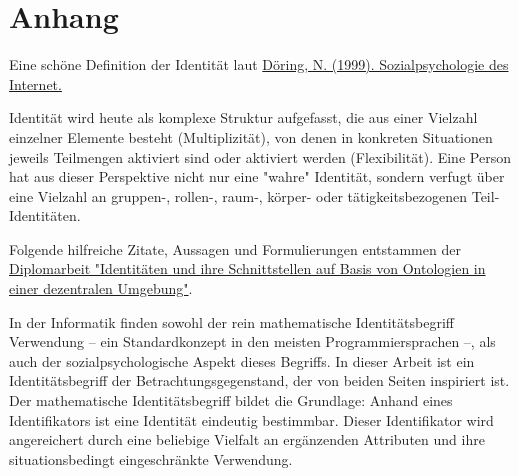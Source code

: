 \section{Anhang}
\label{sec:anhang}

\vspace{0.3cm}

Eine schöne Definition der Identität laut \href{https://link.springer.com/article/10.1007/s11612-001-0022-y}{Döring, N. (1999). Sozialpsychologie des Internet.}

\vspace{0.3cm}

\begin{Business-Def}

Identität wird heute als komplexe Struktur aufgefasst, die aus einer Vielzahl einzelner Elemente besteht (Multiplizität), von denen in konkreten Situationen jeweils Teilmengen aktiviert sind oder aktiviert werden (Flexibilität). Eine Person hat aus dieser Perspektive nicht nur eine "wahre" Identität, sondern verfugt über eine Vielzahl an gruppen-, rollen-, raum-, körper- oder tätigkeitsbezogenen Teil-Identitäten.

\end{Business-Def}

\vspace{0.3cm}

Folgende hilfreiche Zitate, Aussagen und Formulierungen entstammen der \href{https://vsis-www.informatik.uni-hamburg.de/getDoc.php/thesis/47/DA_Gordian_Kaulbarsch.pdf}{Diplomarbeit "Identitäten und ihre Schnittstellen auf Basis von Ontologien in einer dezentralen Umgebung"}. 

\vspace{0.3cm}

\begin{Zitat}

In der Informatik finden sowohl der rein mathematische Identitätsbegriff Verwendung
– ein Standardkonzept in den meisten Programmiersprachen –, als auch der sozialpsychologische Aspekt dieses Begriffs. In dieser Arbeit ist ein Identitätsbegriff der Betrachtungsgegenstand, der von beiden Seiten inspiriert ist. Der mathematische Identitätsbegriff bildet die Grundlage: Anhand eines Identifikators ist eine Identität eindeutig
bestimmbar. Dieser Identifikator wird angereichert durch eine beliebige Vielfalt an ergänzenden Attributen und ihre situationsbedingt eingeschränkte Verwendung.

\end{Zitat}


